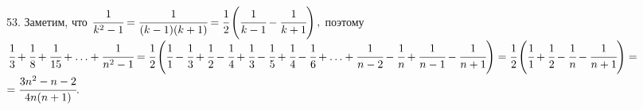 53. Заметим, что $\cfrac{1}{k^2-1}=\cfrac{1}{(k-1)(k+1)}=\cfrac{1}{2}\left(\cfrac{1}{k-1}-\cfrac{1}{k+1}\right),$ поэтому
$\cfrac{1}{3}+\cfrac{1}{8}+\cfrac{1}{15}+\ldots+\cfrac{1}{n^2-1}=\cfrac{1}{2}\left(\cfrac{1}{1}-\cfrac{1}{3}+\cfrac{1}{2}-\cfrac{1}{4}+
\cfrac{1}{3}-\cfrac{1}{5}+\cfrac{1}{4}-\cfrac{1}{6}+\ldots+\cfrac{1}{n-2}-\cfrac{1}{n}+\cfrac{1}{n-1}-\cfrac{1}{n+1}\right)=
\cfrac{1}{2}\left(\cfrac{1}{1}+\cfrac{1}{2}-\cfrac{1}{n}-\cfrac{1}{n+1}\right)=$\\$=\cfrac{3n^2-n-2}{4n(n+1)}.$\\
